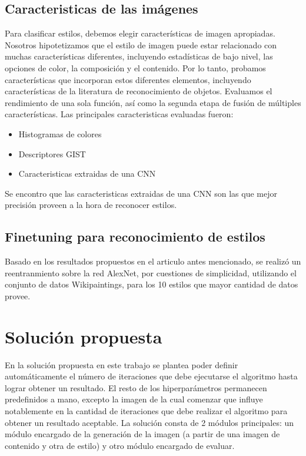 \documentclass[a4paper,11pt,spanish]{book}
\begin{document}
    \subsection{Caracteristicas de las imágenes}
	Para clasificar estilos, debemos elegir características de imagen apropiadas. Nosotros hipotetizamos que el estilo de imagen puede estar relacionado con muchas características diferentes,
	incluyendo estadísticas de bajo nivel, las opciones de color, la composición y el contenido. Por lo tanto, probamos características que incorporan estos diferentes elementos, incluyendo características de la
	literatura de reconocimiento de objetos. Evaluamos el rendimiento de una sola función, así como la segunda etapa de fusión de múltiples características.
	Las principales caracteristicas evaluadas fueron:
	\begin{itemize}
	 \item Histogramas de colores
	 \item Descriptores GIST
	 \item Caracteristicas extraidas de una CNN
	\end{itemize}
	Se encontro que las caracteristicas extraidas de una CNN son las que mejor precisión proveen a la hora de reconocer estilos.

    \subsection{Finetuning para reconocimiento de estilos}
      Basado en los resultados propuestos en el articulo antes mencionado, se realizó un reentranmiento sobre la red AlexNet, por cuestiones de simplicidad, utilizando
      el conjunto de datos Wikipaintings, para los 10 estilos que mayor cantidad de datos provee.

  \section{Solución propuesta}
    En la solución propuesta en este trabajo se plantea poder definir automáticamente el número de iteraciones que debe ejecutarse el algoritmo hasta lograr obtener un resultado.
    El resto de los hiperparámetros permanecen predefinidos a mano, excepto la imagen de la cual comenzar que influye notablemente en la cantidad de iteraciones que debe realizar el
    algoritmo para obtener un resultado aceptable.
    La solución consta de 2 módulos principales: un módulo encargado de la generación de la imagen (a partir de una imagen de contenido y otra de estilo) y otro módulo encargado de
    evaluar.
\end{document}
